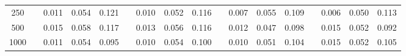 % 
\begin{tabular}{ccccccccccccccccc}
  \hline
  \hline
250 &  & 0.011 & 0.054 & 0.121 &  & 0.010 & 0.052 & 0.116 &  & 0.007 & 0.055 & 0.109 &  & 0.006 & 0.050 & 0.113 \\ 
  500 &  & 0.015 & 0.058 & 0.117 &  & 0.013 & 0.056 & 0.116 &  & 0.012 & 0.047 & 0.098 &  & 0.015 & 0.052 & 0.092 \\ 
  1000 &  & 0.011 & 0.054 & 0.095 &  & 0.010 & 0.054 & 0.100 &  & 0.010 & 0.051 & 0.104 &  & 0.015 & 0.052 & 0.105 \\ 
   \hline
\end{tabular}

